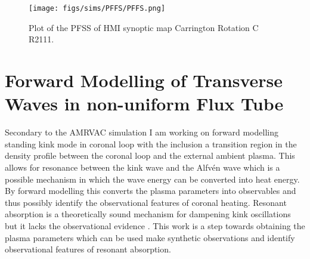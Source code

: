 \documentclass[12pt,a4paper,twoside]{article}
\newcommand{\Alfven}{Alfv\'{e}n }
\begin{document}
\begin{figure}[h]
 \centering
 \texttt{[image: figs/sims/PFFS/PFFS.png]}
 \caption{Plot of the PFSS of HMI synoptic map Carrington Rotation C R2111.}
 \label{PFSS}
\end{figure}
\section{Forward Modelling of Transverse Waves in non-uniform Flux Tube}
Secondary to the AMRVAC simulation I am working on forward modelling standing kink mode in coronal loop with the inclusion a transition region in the density profile between the coronal loop and the external ambient plasma. This allows for resonance between the kink wave and the \Alfven wave which is a possible mechanism in which the wave energy can be converted into heat energy. By forward modelling this converts the plasma parameters into observables and thus possibly identify the observational features of coronal heating. Resonant absorption is a theoretically sound mechanism for dampening kink oscillations but it lacks the observational evidence \citep{Antolin_2015a}. This work is a step towards obtaining the plasma parameters which can be used make synthetic observations and identify observational features of resonant absorption.   
\end{document}
